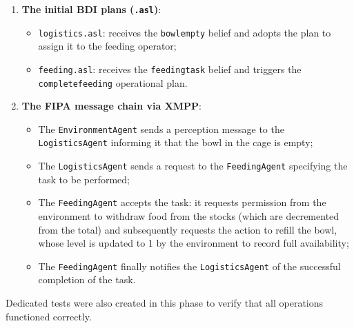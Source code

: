 \documentclass{article}
\renewcommand{\_}{\oldtextunderscore\allowbreak}
\begin{document}
\begin{enumerate}
    \item \textbf{The initial BDI plans (\texttt{.asl})}:
    \begin{itemize}
        \item \texttt{logistics.asl}: receives the \texttt{bowl\_empty} belief and adopts the plan to assign it to the feeding operator;
        \item \texttt{feeding.asl}: receives the \texttt{feeding\_task} belief and triggers the \texttt{complete\_feeding} operational plan.
    \end{itemize}
    \item \textbf{The FIPA message chain via XMPP}:
    \begin{itemize}
        \item The \texttt{EnvironmentAgent} sends a perception message to the \texttt{LogisticsAgent} informing it that the bowl in the cage is empty;
        \item The \texttt{LogisticsAgent} sends a request to the \texttt{FeedingAgent} specifying the task to be performed;
        \item The \texttt{FeedingAgent} accepts the task: it requests permission from the environment to withdraw food from the stocks (which are decremented from the total) and subsequently requests the action to refill the bowl, whose level is updated to 1 by the environment to record full availability;
        \item The \texttt{FeedingAgent} finally notifies the \texttt{LogisticsAgent} of the successful completion of the task.
    \end{itemize}
\end{enumerate}
Dedicated tests were also created in this phase to verify that all operations functioned correctly.
\end{document}
